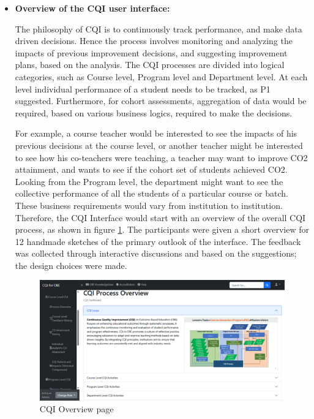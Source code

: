 \documentclass[journal,onecolumn]{IEEEtran}
\begin{document}
\begin{itemize}
    \item \textbf{Overview of the CQI user interface: }
    
    The philosophy of CQI is to continuously track performance, and make data driven decisions. Hence the process involves monitoring and analyzing the impacts of previous improvement decisions, and suggesting improvement plans, based on the analysis. The CQI processes are divided into logical categories, such as Course level, Program level and Department level. At each level individual performance of a student needs to be tracked, as P1 suggested. Furthermore, for cohort assessments, aggregation of data would be required, based on various business logics, required to make the decisions.

For example, a course teacher would be interested to see the impacts of his previous decisions at the course level, or another teacher might be interested to see how his co-teachers were teaching, a teacher may want to improve CO2 attainment, and wants to see if the cohort set of students achieved CO2. Looking from the Program level, the department might want to see the collective performance of all the students of a particular course or batch. These business requirements would vary from institution to institution. Therefore, the CQI Interface would start with an overview of the overall CQI process, as shown in figure \ref{fig:CQI-Overview-page}. The participants were given a short overview for 12 handmade sketches of the primary outlook of the interface. The feedback was collected through interactive discussions and based on the suggestions; the design choices were made. 


\begin{figure}
    \centering
    \includegraphics[width=0.8\linewidth]{img/Picture8.png}
    \caption{CQI Overview page}
    \label{fig:CQI-Overview-page}
\end{figure}





\end{itemize}
\end{document}
